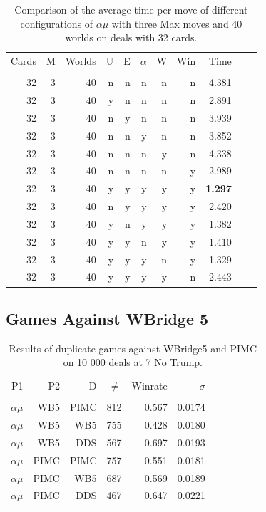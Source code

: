 \documentclass[letterpaper]{article} %
\begin{document}
\begin{table}
  \centering
  \caption{Comparison of the average time per move of different
  configurations of $\alpha\mu$ with three Max moves and 40 worlds on deals with 32 cards.}
  \label{tableTime-3-40-32}
  \begin{tabular}{rrrrrrrrrrr}
Cards & M & Worlds & U & E & $\alpha$ & W & Win &  Time\\
      &   &        &    &   &         &   &     &      \\
   32 & 3 &     40 &  n & n &       n & n &   n & 4.381\\
   32 & 3 &     40 &  y & n &       n & n &   n & 2.891\\
   32 & 3 &     40 &  n & y &       n & n &   n & 3.939\\
   32 & 3 &     40 &  n & n &       y & n &   n & 3.852\\
   32 & 3 &     40 &  n & n &       n & y &   n & 4.338\\
   32 & 3 &     40 &  n & n &       n & n &   y & 2.989\\
   32 & 3 &     40 &  y & y &       y & y &   y & \bf 1.297\\
   32 & 3 &     40 &  n & y &       y & y &   y & 2.420\\
   32 & 3 &     40 &  y & n &       y & y &   y & 1.382\\
   32 & 3 &     40 &  y & y &       n & y &   y & 1.410\\
   32 & 3 &     40 &  y & y &       y & n &   y & 1.329\\
   32 & 3 &     40 &  y & y &       y & y &   n & 2.443\\
  \end{tabular}
\end{table}

\subsection{Games Against WBridge 5}

\begin{table}
  \centering
  \caption{Results of duplicate games against WBridge5 and PIMC on 10 000 deals at 7 No Trump.}
  \label{tableWB5}
  \begin{tabular}{rrrrrrrrrrr}
 P1          &   P2 &    D & $\neq$ & Winrate & $\sigma$\\
             &      &      &       &         &         \\
 $\alpha\mu$ &  WB5 & PIMC &   812 &   0.567 &  0.0174 \\
 $\alpha\mu$ &  WB5 &  WB5 &   755 &   0.428 &  0.0180 \\
 $\alpha\mu$ &  WB5 &  DDS &   567 &   0.697 &  0.0193 \\
 $\alpha\mu$ & PIMC & PIMC &   757 &   0.551 &  0.0181 \\
 $\alpha\mu$ & PIMC &  WB5 &   687 &   0.569 &  0.0189 \\
 $\alpha\mu$ & PIMC &  DDS &   467 &   0.647&   0.0221 \\
  \end{tabular}
\end{table}
\end{document}
